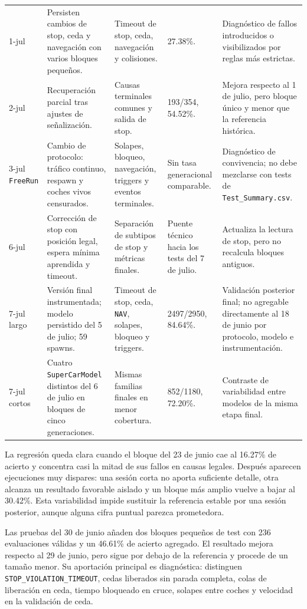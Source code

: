{\begin{longtable}{L{2.05cm}L{3.15cm}L{2.75cm}L{2.35cm}L{3.7cm}}
1-jul & Persisten cambios de stop, ceda y navegación con varios bloques pequeños. & Timeout de stop, ceda, navegación y colisiones. & 27.38\%. & Diagnóstico de fallos introducidos o visibilizados por reglas más estrictas.\\
2-jul & Recuperación parcial tras ajustes de señalización. & Causas terminales comunes y salida de stop. & 193/354, 54.52\%. & Mejora respecto al 1 de julio, pero bloque único y menor que la referencia histórica.\\
3-jul \texttt{FreeRun} & Cambio de protocolo: tráfico continuo, respawn y coches vivos censurados. & Solapes, bloqueo, navegación, triggers y eventos terminales. & Sin tasa generacional comparable. & Diagnóstico de convivencia; no debe mezclarse con tests de \texttt{Test\_Summary.csv}.\\
6-jul & Corrección de stop con posición legal, espera mínima aprendida y timeout. & Separación de subtipos de stop y métricas finales. & Puente técnico hacia los tests del 7 de julio. & Actualiza la lectura de stop, pero no recalcula bloques antiguos.\\
7-jul largo & Versión final instrumentada; modelo persistido del 5 de julio; 59 spawns. & Timeout de stop, ceda, \texttt{NAV}, solapes, bloqueo y triggers. & 2497/2950, 84.64\%. & Validación posterior final; no agregable directamente al 18 de junio por protocolo, modelo e instrumentación.\\
7-jul cortos & Cuatro \texttt{SuperCarModel} distintos del 6 de julio en bloques de cinco generaciones. & Mismas familias finales en menor cobertura. & 852/1180, 72.20\%. & Contraste de variabilidad entre modelos de la misma etapa final.\\
\end{longtable}
}

La regresión queda clara cuando el bloque del 23 de junio cae al 16.27\% de acierto y concentra casi la mitad de sus fallos en causas legales. Después aparecen ejecuciones muy dispares: una sesión corta no aporta suficiente detalle, otra alcanza un resultado favorable aislado y un bloque más amplio vuelve a bajar al 30.42\%. Esta variabilidad impide sustituir la referencia estable por una sesión posterior, aunque alguna cifra puntual parezca prometedora.

Las pruebas del 30 de junio añaden dos bloques pequeños de test con 236 evaluaciones válidas y un 46.61\% de acierto agregado. El resultado mejora respecto al 29 de junio, pero sigue por debajo de la referencia y procede de un tamaño menor. Su aportación principal es diagnóstica: distinguen \texttt{STOP\_VIOLATION\_TIMEOUT}, cedas liberados sin parada completa, colas de liberación en ceda, tiempo bloqueado en cruce, solapes entre coches y velocidad en la validación de ceda.

